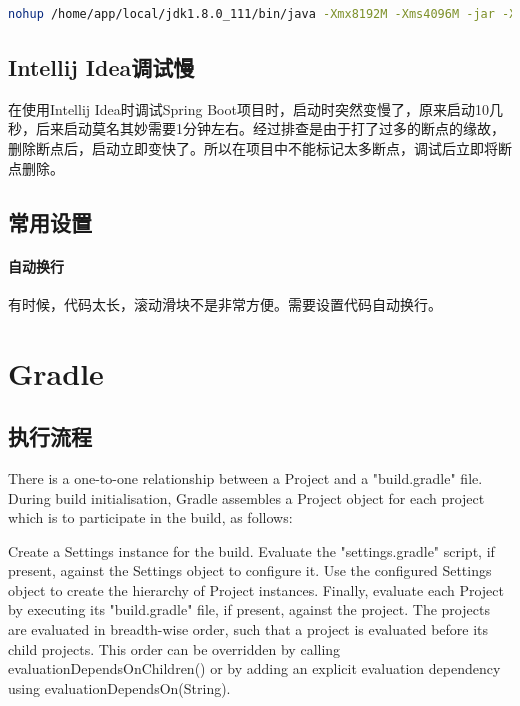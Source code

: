 \documentclass[letter]{book}
\begin{document}
\begin{lstlisting}[language=Bash]
nohup /home/app/local/jdk1.8.0_111/bin/java -Xmx8192M -Xms4096M -jar -Xdebug -Xrunjdwp:transport=dt_socket,suspend=n,server=y,address=5005 /home/app/backend/system-web-boot-1.0.9.jar --spring.config.location=application.properties>/dev/null &
\end{lstlisting}



\subsection{Intellij Idea调试慢}

在使用Intellij Idea时调试Spring Boot项目时，启动时突然变慢了，原来启动10几秒，后来启动莫名其妙需要1分钟左右。经过排查是由于打了过多的断点的缘故，删除断点后，启动立即变快了。所以在项目中不能标记太多断点，调试后立即将断点删除。

\subsection{常用设置}

\paragraph{自动换行}有时候，代码太长，滚动滑块不是非常方便。需要设置代码自动换行。

\section*{Gradle}

\subsection{执行流程}

There is a one-to-one relationship between a Project and a "build.gradle" file. During build initialisation, Gradle assembles a Project object for each project which is to participate in the build, as follows:

Create a Settings instance for the build.
Evaluate the "settings.gradle" script, if present, against the Settings object to configure it.
Use the configured Settings object to create the hierarchy of Project instances.
Finally, evaluate each Project by executing its "build.gradle" file, if present, against the project. The projects are evaluated in breadth-wise order, such that a project is evaluated before its child projects. This order can be overridden by calling evaluationDependsOnChildren() or by adding an explicit evaluation dependency using evaluationDependsOn(String).
\end{document}
